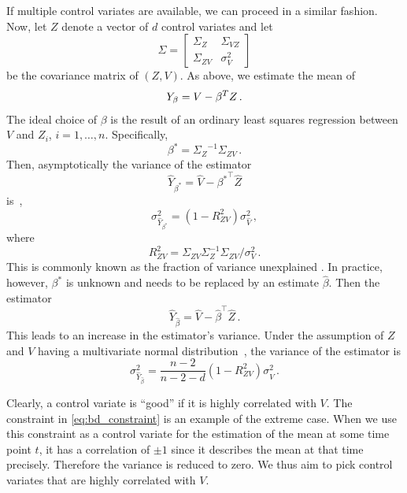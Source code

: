 If multiple control variates are available, we can proceed in a similar fashion.
Now, let ${Z}$ denote a vector of $d$ control variates and let
\[
  \Sigma=
  \begin{bmatrix}
    \Sigma_{ Z} & \Sigma_{V Z}\\
    \Sigma_{ Z V} & \sigma_V^2
  \end{bmatrix}
\]
be the covariance matrix of $({Z},V)$.
As above, we estimate the mean of
\[
  {Y}_{\beta}=V -{\beta}^{T}{Z}\,.
\]
The ideal choice of $\beta$ is the result of an ordinary least
squares regression between $V$
and $Z_i$, $i=1,\dots,n$.
Specifically,
\[
  \beta^{*}={\Sigma_{ Z}}^{-1}{\Sigma}_{ Z V}\,.
\]
Then, asymptotically
the variance of the estimator
\begin{equation}
  \hat{Y}_{{\beta^*}}=\hat{V}-{\beta^*}^{\top}\hat{ Z}
\end{equation}
is~\parencite{szechtman2003control},
\begin{equation}\label{eq:lcv_asym}
  {\sigma_{\hat Y_{\beta^*}}^2} = (1 - R_{ Z V}^2){\sigma_{\hat V}^2}\,,
\end{equation}
where
\begin{equation*}
  R_{ Z V}^2=\Sigma_{ Z V}\Sigma_{ Z}^{-1}\Sigma_{ Z V} / \sigma_V^2\,.
\end{equation*}
This is commonly known as the fraction of variance unexplained
\parencite{freedman2009statistical}.
In practice, however, $\beta^*$ is unknown and needs to be replaced by
an estimate $\hat{\beta}$.
Then the estimator
\begin{equation}
  \hat{Y}_{\hat{\beta}}=\hat{V}-\hat{\beta}^{\top}\hat{ Z}\,.
\end{equation}
This leads to an increase in the estimator's variance.
Under the assumption of $Z$ and $V$ having a multivariate normal
distribution~\parencite{cheng1978analysis,lavenberg1982statistical},
the variance of the estimator is
\begin{equation}\label{eq:lcv_norm_varred}
  {\sigma_{\hat{Y}_{\hat{\beta}}}^2} = \frac{n - 2}{n - 2 - d}(1 -
  R_{ ZV}^2){\sigma_{\hat V}^2}\,.
\end{equation}

Clearly, a control  variate is ``good'' if it is highly correlated with $V$.
The constraint in \eqref{eq:bd_constraint} is an example of the extreme case.
When we use this constraint as a control variate
for the estimation of the mean at some time point $t$, it has a
correlation of $\pm1$
since it describes the mean at that time precisely.
Therefore the variance is reduced to zero.
We thus aim to pick control  variates that are highly correlated with $V$.

